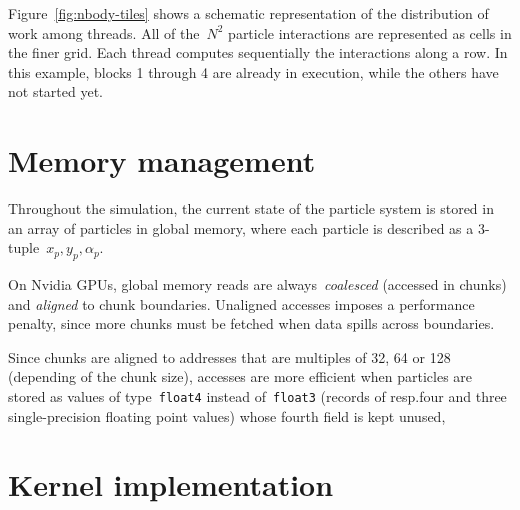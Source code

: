 Figure~\ref{fig:nbody-tiles} shows a schematic representation
of the distribution of work among threads.
All of the~\(N^2\) particle interactions are represented
as cells in the finer grid.
Each thread computes sequentially the interactions
along a row.
In this example, blocks 1 through 4 are already in execution,
while the others have not started yet.

\section{Memory management}
\label{sec:memory-management}

Throughout the simulation,
the current state of the particle system
is stored in an array of particles in global memory,
where each particle is described as a 3-tuple~\(x_p, y_p, α_p\).

On Nvidia GPUs,
global memory reads are always~\emph{coalesced} (accessed in chunks)
and \emph{aligned} to chunk boundaries.
Unaligned accesses imposes a performance penalty,
since more chunks must be fetched
when data spills across boundaries.

Since chunks are aligned to addresses that are
multiples of 32, 64 or 128 (depending of the chunk size),
accesses are more efficient when particles are stored
as values of type~\texttt{float4} instead of~\texttt{float3}
(records of resp.\@ four and three single-precision floating point values)
whose fourth field is kept unused,


\section{Kernel implementation}
\label{sec:kernel-implementation}


